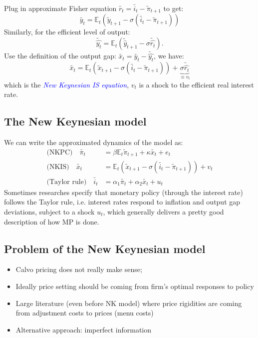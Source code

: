 Plug in approximate Fisher equation $\tilde{r_t} = \tilde{i_t} - \tilde{\pi}_{t+1}$ to get:
\[\tilde{y_t} = \mathbb{E}_t \left(\tilde{y}_{t+1} - \sigma (\tilde{i_t} - \tilde{\pi}_{t+1} ) \right)\]
Similarly, for the efficient level of output:
\[\tilde{\hat{y_t}} = \mathbb{E}_t \left(\tilde{\hat{y}}_{t+1} - \sigma \tilde{\hat{r_t}}\right).\]
Use the definition of the output gap: $\tilde{x_t} = \tilde{y_t} - \tilde{\hat{y_t}}$, we have:
\begin{equation*}\label{NKIS}
    \tilde{x_t} = \mathbb{E}_t \left(\tilde{x}_{t+1} - \sigma (\tilde{i_t} - \tilde{\pi}_{t+1}) \right) + \underset{\equiv v_t}{\underbrace{\sigma \tilde{\hat{r_t}}}}
\end{equation*}
which is the \textcolor{blue}{\textit{New Keynesian IS equation}}, $v_t$ is a shock to the efficient real interest rate.

\subsection{The New Keynesian model}
We can write the approximated dynamics of the model as:
\begin{align}
    \text{(NKPC)} \quad \tilde{\pi _t} &= \beta \mathbb{E}_t \tilde{\pi}_{t+1} + \kappa \tilde{x_t} + e_t \nonumber \\
    \text{(NKIS)} \quad \tilde{x_t} &= \mathbb{E}_t \left(\tilde{x}_{t+1} - \sigma (\tilde{i_t} - \tilde{\pi}_{t+1}) \right) + v_t \nonumber \\
    \text{(Taylor rule)} \quad \tilde{i_t} &= \alpha_1 \tilde{\pi_t} + \alpha_2 \tilde{x_t} + u_t \nonumber
\end{align}
Sometimes researches specify that monetary policy (through the
interest rate) follows the Taylor rule, i.e. interest rates respond to
inflation and output gap deviations, subject to a shock $u_t$,
which generally delivers a pretty good description of how MP is
done.

\subsection{Problem of the New Keynesian model}
\begin{itemize}
    \item Calvo pricing does not really make sense;
    \item Ideally price setting should be coming from ﬁrm's optimal
    responses to policy
    \item Large literature (even before NK model) where price rigidities
    are coming from adjustment costs to prices (menu costs)
    \item Alternative approach: imperfect information
\end{itemize}